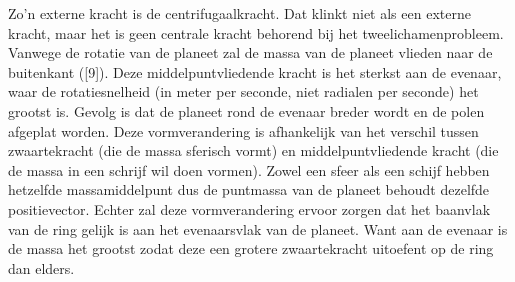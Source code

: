 \documentclass[a4paper]{article}
\begin{document}
\noindent
Zo'n externe kracht is de centrifugaalkracht. Dat klinkt niet als een externe kracht, maar het is geen centrale kracht behorend bij het tweelichamenprobleem. Vanwege de rotatie van de planeet zal de massa van de planeet vlieden naar de buitenkant ([9]). Deze middelpuntvliedende kracht is het sterkst aan de evenaar, waar de rotatiesnelheid (in meter per seconde, niet radialen per seconde) het grootst is. Gevolg is dat de planeet rond de evenaar breder wordt en de polen afgeplat worden. Deze vormverandering is afhankelijk van het verschil tussen zwaartekracht (die de massa sferisch vormt) en middelpuntvliedende kracht (die de massa in een schrijf wil doen vormen). Zowel een sfeer als een schijf hebben hetzelfde massamiddelpunt dus de puntmassa van de planeet behoudt dezelfde positievector. Echter zal deze vormverandering ervoor zorgen dat het baanvlak van de ring gelijk is aan het evenaarsvlak van de planeet. Want aan de evenaar is de massa het grootst zodat deze een grotere zwaartekracht uitoefent op de ring dan elders.\\
\end{document}
